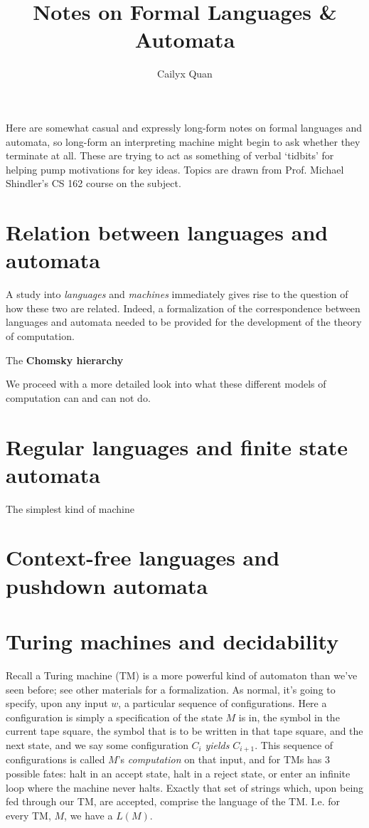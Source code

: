 \documentclass[11pt]{article}
\title{Notes on Formal Languages \& Automata}
\author{Cailyx Quan}
\begin{document}
\maketitle

Here are somewhat casual and expressly long-form notes on formal languages and automata, so long-form an interpreting machine might begin to ask whether they terminate at all. These are trying to act as something of verbal `tidbits' for helping pump motivations for key ideas. Topics are drawn from Prof. Michael Shindler's CS 162 course on the subject.

\section{Relation between languages and automata}
A study into \emph{languages} and \emph{machines} immediately gives rise to the question of how these two are related. Indeed, a formalization of the correspondence between languages and automata needed to be provided for the development of the theory of computation.

The \textbf{Chomsky hierarchy}

We proceed with a more detailed look into what these different models of computation can and can not do.

\section{Regular languages and finite state automata}
The simplest kind of machine 

\section{Context-free languages and pushdown automata}


\section{Turing machines and decidability}

Recall a Turing machine (TM) is a more powerful kind of automaton than we’ve seen before; see other materials for a formalization. As normal, it’s going to specify, upon any input $w$, a particular sequence of configurations. Here a configuration is simply a specification of the state $M$ is in, the symbol in the current tape square, the symbol that is to be written in that tape square, and the next state, and we say some configuration $C_i$ \emph{yields} $C_{i+1}$. This sequence of configurations is called $M$'s \emph{computation} on that input, and for TMs has 3 possible fates: halt in an accept state, halt in a reject state, or enter an infinite loop where the machine never halts. Exactly that set of strings which, upon being fed through our TM, are accepted, comprise the language of the TM. I.e. for every TM, $M$, we have a $L(M)$.  
\end{document}
